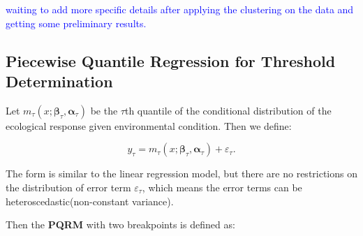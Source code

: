\textcolor{blue}{waiting to add more specific details after applying the clustering on the data and getting
some preliminary results.}









\subsection{Piecewise Quantile Regression for Threshold Determination}


Let $m_\tau(x; \boldsymbol{\beta}_\tau, \boldsymbol{\alpha}_\tau)$ be the $\tau$th quantile of the conditional distribution 
of the ecological response given environmental condition. Then we define:

\[
y_\tau = m_\tau(x; \boldsymbol{\beta}_\tau, \boldsymbol{\alpha}_\tau) + \varepsilon_\tau.
\]

The form is similar to the linear regression model, but there are no restrictions on the distribution of error term $\varepsilon_\tau$, 
which means the error terms can be heteroscedastic(non-constant variance).


Then the \textbf{PQRM} with two breakpoints is defined as:

